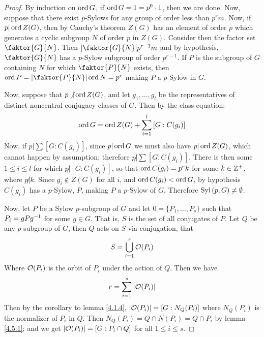 \begin{proof}
    By induction on $\operatorname{ord}{G}$, if $\operatorname{ord}{G}=1=p^0 \cdot 1$, then we are done.
    Now, suppose that there exist $p$-Sylows for any group of order less than
    $p^rm$. Now, if $p|\operatorname{ord}{Z(G)}$, then by Cauchy's theorem $Z(G)$ has an element
    of order $p$ which generates a cyclic subgroup $N$ of order $p$ in $Z(G)$.
    Consider then the factor set $\faktor{G}{N}$. Then $|\faktor{G}{N}|p^{r-1}m$
    and by hypothesis, $\faktor{G}{N}$ has a $p$-Sylow subgroup of order
    $p^{r-1}$. If $P$ is the subgroup of $G$ containing $N$ for which
    $\faktor{P}{N}$ exists, then $\ord{P}=|\faktor{P}{N}|\ord{N}=p^r$ making $P$
    a $p$-Sylow in $G$.

    Now, suppose that  $p \not| \operatorname{ord}{Z(G)}$, and let $g_1, \dots, g_l$ be the
    representatives of distinct noncentral conjugacy classes of $G$. Then by the
    class equation:
    \begin{equation*}
        \operatorname{ord}{G}=\operatorname{ord}{Z(G)}+\sum_{i=1}^l{[G:C(g_i)]}
    \end{equation*}
    Now, if $p|\sum{[G:C(g_i)]}$, since $p|\operatorname{ord}{G}$ we must also have
    $p|\operatorname{ord}{Z(G)}$, which cannot happen by assumption; therefore $p \not|
    \sum{[G:C(g_i)]}$. There is then some $1 \leq i \leq l$ for which  $p \not|
    [G:C(g_i)]$, so that $\operatorname{ord}{C(g_i)}=p^rk$ for some $k \in \mathbb{Z}^+$, where  $p
    \not| k$. Since  $g_i \notin Z(G)$ for all $i$, and $\operatorname{ord}{C(g_i)}<\operatorname{ord}{G}$,
    by hypothesis $C(g_i)$ has a $p$-Sylow, $P$, making  $P$ a $p$-Sylow of $G$.
    Therefore $\operatorname{Syl}{(p,G)} \neq \emptyset$.

    Now, let $P$ be a Sylow $p$-subgroup of $G$ and let  $0=\{P_1, \dots, P_s\}$
    such that $P_i=gPg^{-1}$ for some $g \in G$. That is,  $S$ is the set of
    all conjugates of  $P$. Let $Q$ be any $p$-subgroup of $G$, then $Q$ acts on
     $S$ via conjugation, that
     \begin{equation*}
         S=\bigcup_{i=1}^s{\mathcal{O}(P_i)}
     \end{equation*}
     Where $\mathcal{O}(P_i)$ is the orbit of $P_i$ under the action of  $Q$. Then we
     have
     \begin{equation*}
         r=\sum_{i=1}^s{|\mathcal{O}(P_i)|}
     \end{equation*}
     Then by the corollary to lemma \ref{4.1.4}, $|\mathcal{O}(P_i)|=[G:N_Q(P_i)]$ where
     $N_Q(P_i)$ is the normalizer of $P_i$ in $Q$. Then $N_Q(P_i)=Q \cap N(P_i)=Q
     \cap P_i$ by lemma \ref{4.5.1}; and we get $|\mathcal{O}(P_i)|=[G:P_i \cap Q]$ for
     all $1 \leq i \leq s$.


\end{proof}
